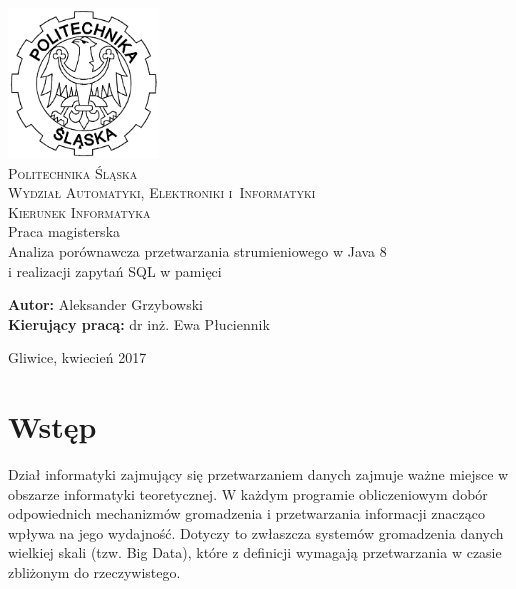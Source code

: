 \documentclass[12pt]{extarticle}
\begin{document}
\begin{titlepage}
    \begin{center}
        \includegraphics[width=4cm]{polsl.png}\\[1cm]
        \textsc{\LARGE{Politechnika Śląska}}\\[0.5cm]
        \textsc{\LARGE{Wydział Automatyki, Elektroniki i~Informatyki}}\\[0.5cm]
        \textsc{\LARGE{Kierunek Informatyka}}\\[2.5cm]
        \LARGE{Praca magisterska}\\[1cm]
        \begingroup
            \fontsize{14pt}{17pt}\selectfont
            Analiza porównawcza przetwarzania strumieniowego w Java 8 \\ i realizacji zapytań SQL w pamięci
        \endgroup
    \end{center}
    \vspace{2cm}
    \begingroup
        \fontsize{14pt}{17pt}\selectfont
        \textbf{Autor:} Aleksander Grzybowski\\
        \textbf{Kierujący pracą:} dr inż. Ewa Płuciennik\\
    \endgroup

    \vspace{2.0cm}
    \begingroup
        \fontsize{12pt}{14pt}\selectfont
        \begin{center}
        Gliwice, kwiecień 2017
        \end{center}
    \endgroup
\end{titlepage}

\clearpage

\tableofcontents

\newpage

\section{Wstęp}

	Dział informatyki zajmujący się przetwarzaniem danych zajmuje ważne miejsce w obszarze informatyki teoretycznej. W każdym programie obliczeniowym dobór odpowiednich mechanizmów gromadzenia i przetwarzania informacji znacząco wpływa na jego wydajność. Dotyczy to zwłaszcza systemów gromadzenia danych wielkiej skali (tzw. Big Data), które z definicji wymagają przetwarzania w czasie zbliżonym do rzeczywistego.
\end{document}
